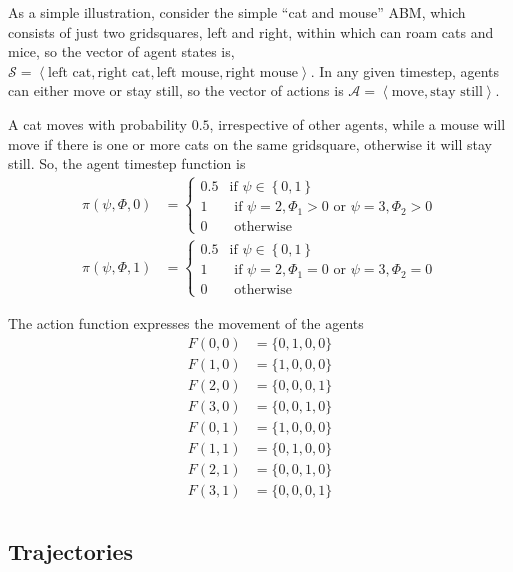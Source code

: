 \documentclass{article}
\begin{document}
As a simple illustration, consider the simple ``cat and mouse'' ABM, which consists of just two gridsquares, left and right, within which can roam cats and mice, so the vector of agent states is, $\mathcal{S} = \left<\textrm{left cat}, \textrm{right cat}, \textrm{left mouse}, \textrm{right mouse} \right>$. In any given timestep, agents can either move or stay still, so the vector of actions is $\mathcal{A} = \left<\textrm{move}, \textrm{stay still}\right>$.

A cat moves with probability $0.5$, irrespective of other agents, while a mouse will move if there is one or more cats on the same gridsquare, otherwise it will stay still. So, the agent timestep function is
\begin{equation}
\begin{aligned}
\pi(\psi, \Phi, 0) &=
\begin{cases}
0.5 & \text{if } \psi \in \left\{0,1\right\}\\
1 & \text{ if } \psi = 2, \Phi_1 > 0 \text{ or } \psi=3, \Phi_2 > 0\\
0 & \text{ otherwise}
\end{cases}\\
\pi(\psi, \Phi, 1) &=
\begin{cases}
0.5 & \text{if } \psi \in \left\{0, 1\right\}\\
1 & \text{ if } \psi = 2, \Phi_1 = 0 \text{ or } \psi=3, \Phi_2 = 0\\
0 & \text{ otherwise}
\end{cases}
\end{aligned}
\end{equation}

The action function expresses the movement of the agents
\begin{equation}
\begin{aligned}
F(0, 0) &= \{0,1,0,0\}\\
F(1, 0) &= \{1,0,0,0\}\\
F(2, 0) &= \{0,0,0,1\}\\
F(3, 0) &= \{0,0,1,0\}\\
F(0, 1) &= \{1,0,0,0\}\\
F(1, 1) &= \{0,1,0,0\}\\
F(2, 1) &= \{0,0,1,0\}\\
F(3, 1) &= \{0,0,0,1\}\\
\end{aligned}
\end{equation}

\subsection{Trajectories}
\end{document}
